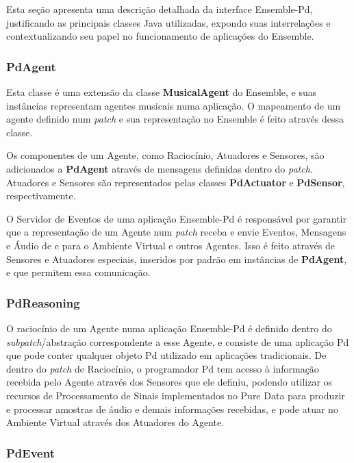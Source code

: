 \documentclass[a4paper, 11pt, twoside]{article}
\begin{document}
\begin{multicols}{2}
Esta seção apresenta uma descrição detalhada da interface Ensemble-Pd,
justificando as principais classes Java utilizadas, expondo suas 
interrelações e contextualizando seu papel no funcionamento de aplicações
do Ensemble.

\subsubsection{PdAgent}

Esta classe é uma extensão da classe \textbf{MusicalAgent} do Ensemble,
e suas instâncias representam agentes musicais numa aplicação.
O mapeamento de um agente definido num \textit{patch} e sua representação no 
Ensemble é feito através dessa classe.

Os componentes de um Agente, como Raciocínio, Atuadores e Sensores, são
adicionados a \textbf{PdAgent} através de mensagens definidas dentro do
\textit{patch}. Atuadores e Sensores são representados pelas classes 
\textbf{PdActuator} e \textbf{PdSensor}, respectivamente.

O Servidor de Eventos de uma aplicação Ensemble-Pd é responsável por garantir 
que a representação de um Agente num \textit{patch} receba e envie Eventos, 
Mensagens e Áudio de e para o Ambiente Virtual e outros Agentes. Isso é feito
através de Sensores e Atuadores especiais, inseridos por padrão em instâncias
de \textbf{PdAgent}, e que permitem essa comunicação.

\subsubsection{PdReasoning}

O raciocínio de um Agente numa aplicação Ensemble-Pd é definido dentro do
\textit{subpatch}/abstração correspondente a esse Agente, e consiste de
uma aplicação Pd que pode conter qualquer objeto Pd utilizado em aplicações
tradicionais. De dentro do \textit{patch} de Raciocínio, o programador Pd tem 
acesso à informação recebida pelo Agente através dos Sensores que ele definiu,
podendo utilizar os recursos de Processamento de Sinais implementados no Pure
Data para produzir e processar amostras de áudio e demais informações 
recebidas, e pode atuar no Ambiente Virtual através dos Atuadores do Agente.

\subsubsection{PdEvent}


\end{multicols}
\end{document}
